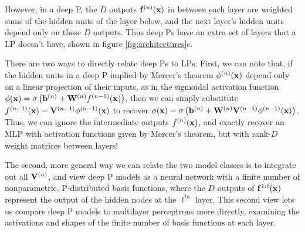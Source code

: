 \documentclass[twoside]{article}
\makeatletter
\newlength{\nonHumbleHeight}
\def\@humbleformat#1{{\settoheight{\nonHumbleHeight}{#1}\resizebox{!}{0.94\nonHumbleHeight}{#1}}}%
\def\humble#1{\@humbleformat{#1}}%
\newcommand{\gp}{{\humble GP}}
\newcommand{\MLP}{{\humble MLP}}
\makeatother
\begin{document}
However, in a deep \gp{}, the $D$ outputs ${\bf{f}}^{(n)}({\bf{x}})$ in between each layer are weighted sums of the hidden units of the layer below, and the next layer's hidden units depend only on these $D$ outputs.  Thus deep \gp{}s have an extra set of layers that a \MLP{} doesn't have, shown in figure \ref{fig:architectures}c.

There are two ways to directly relate deep \gp{}s to \MLP{}s.  First, we can note that, if the hidden units in a deep \gp{} implied by Mercer's theorem $\phi^{(n)}({\bf{x}})$ depend only on a linear projection of their inputs, as in the sigmoidal activation function $\phi({\bf{x}}) = \sigma \left( {\bf{b}}^{(n)} + \mathbf{W}^{(n)}f^{(n-1)}({\bf{x}}) \right)$, then we can simply substitute $f^{(n-1)}({\bf{x}}) = \mathbf{V}^{(n-1)} \phi^{(n-1)}({\bf{x}})$ to recover $\phi({\bf{x}}) = \sigma \left( {\bf{b}}^{(n)} + \mathbf{W}^{(n)} \mathbf{V}^{(n-1)} \phi^{(n-1)}({\bf{x}}) \right)$.  Thus, we can ignore the intermediate outputs $f^{(n)}({\bf{x}})$, and exactly recover an MLP with activation functions given by Mercer's theorem, but with rank-$D$ weight matrices 
 between layers!

The second, more general way we can relate the two model classes is to integrate out all $\mathbf{V}^{(n)}$, and view deep \gp{} models as a neural network with a finite number of nonparametric, \gp{}-distributed basis functions, where the $D$ outputs of ${\bf{f}}^{1:\ell}({\bf{x}})$ represent the output of the hidden nodes at the $\ell^{th}$ layer.
%
This second view lets us compare deep \gp{} models to multilayer perceptrons more directly, examining the activations and shapes of the finite number of basis functions at each layer.

%
%

\end{document}
